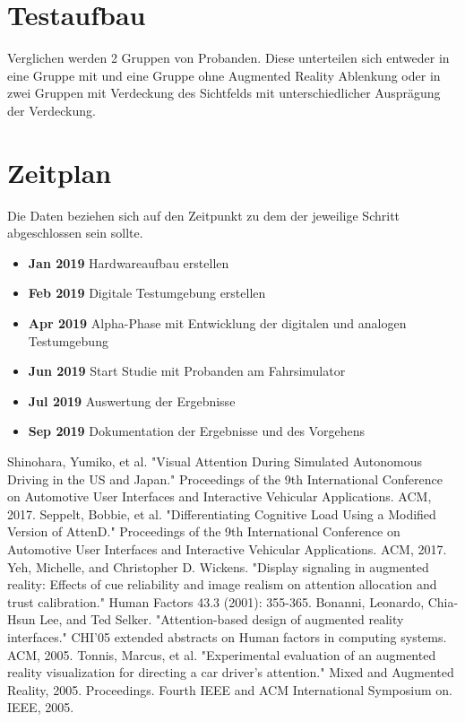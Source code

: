 \documentclass[a4paper, 11pt]{article}
\begin{document}
\section*{Testaufbau}
Verglichen werden 2 Gruppen von Probanden. Diese unterteilen sich entweder in eine Gruppe mit und eine Gruppe ohne Augmented Reality Ablenkung oder in zwei Gruppen mit Verdeckung des Sichtfelds mit unterschiedlicher Ausprägung der Verdeckung.

\section*{Zeitplan}
Die Daten beziehen sich auf den Zeitpunkt zu dem der jeweilige Schritt abgeschlossen sein sollte.
\begin{itemize}
    \item \textbf{Jan 2019} Hardwareaufbau erstellen
    \item \textbf{Feb 2019} Digitale Testumgebung erstellen
    \item \textbf{Apr 2019} Alpha-Phase mit Entwicklung der digitalen und analogen Testumgebung
    \item \textbf{Jun 2019} Start Studie mit Probanden am Fahrsimulator
    \item \textbf{Jul 2019} Auswertung der Ergebnisse
    \item \textbf{Sep 2019} Dokumentation der Ergebnisse und des Vorgehens
\end{itemize}

\begin{thebibliography}{9}
 Shinohara, Yumiko, et al. "Visual Attention During Simulated Autonomous Driving in the US and Japan." Proceedings of the 9th International Conference on Automotive User Interfaces and Interactive Vehicular Applications. ACM, 2017.
 Seppelt, Bobbie, et al. "Differentiating Cognitive Load Using a Modified Version of AttenD." Proceedings of the 9th International Conference on Automotive User Interfaces and Interactive Vehicular Applications. ACM, 2017.
 Yeh, Michelle, and Christopher D. Wickens. "Display signaling in augmented reality: Effects of cue reliability and image realism on attention allocation and trust calibration." Human Factors 43.3 (2001): 355-365.
 Bonanni, Leonardo, Chia-Hsun Lee, and Ted Selker. "Attention-based design of augmented reality interfaces." CHI'05 extended abstracts on Human factors in computing systems. ACM, 2005.
 Tonnis, Marcus, et al. "Experimental evaluation of an augmented reality visualization for directing a car driver's attention." Mixed and Augmented Reality, 2005. Proceedings. Fourth IEEE and ACM International Symposium on. IEEE, 2005.
\end{thebibliography}
\end{document}
